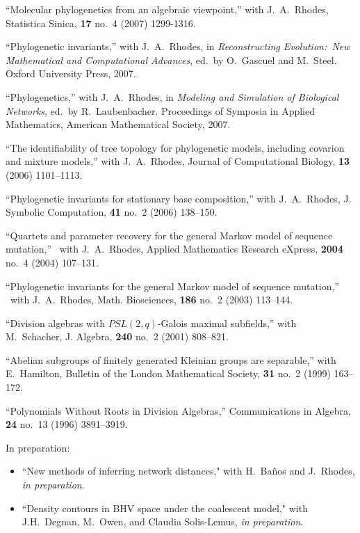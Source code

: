 \documentclass[10pt]{report}
\begin{document}
{{``Molecular phylogenetics from an algebraic viewpoint,'' with J.~A.~Rhodes,
Statistica Sinica, {\bf 17} no.~4 (2007) 1299-1316.

``Phylogenetic invariants,'' with J.~A.~Rhodes, in
\emph{Reconstructing Evolution:~New Mathematical and Computational Advances}, ed.~by O.~Gascuel and
M.~Steel. Oxford University Press, 2007.

``Phylogenetics,'' with J.~A.~Rhodes, in \emph{Modeling and Simulation of
Biological Networks}, ed.~by R.~Laubenbacher. Proceedings of
Symposia in Applied Mathematics, American Mathematical Society,
2007.

``The identifiability of tree topology for phylogenetic models,
including covarion and mixture models,'' with J.~A.~Rhodes, Journal
of Computational Biology, {\bf 13}  (2006) 1101--1113.

``Phylogenetic invariants for stationary base composition,''
with J.~A.~Rhodes, J. Symbolic Computation, {\bf 41} no.~2
(2006) 138--150.

``Quartets and parameter recovery for the general Markov model of
sequence mutation,'' \ with J.~A.~Rhodes, Applied Mathematics
Research eXpress, {\bf 2004} no.~4 (2004) 107--131.

``Phylogenetic invariants for the general Markov model of sequence
mutation,'' \ with J.~A.~Rhodes, Math. Biosciences, {\bf 186}
no.~2 (2003) 113--144.

``Division algebras with $PSL(2,q)$-Galois maximal subfields,'' with
M.~Schacher, J. Algebra, {\bf 240} no.~2 (2001) 808--821.

``Abelian subgroups of finitely generated Kleinian groups are
separable,'' with E.~Hamilton, Bulletin of the London
Mathematical Society, {\bf 31} no.~2 (1999) 163--172.

``Polynomials Without Roots in Division Algebras,''
Communications in Algebra, {\bf 24} no.~13 (1996) 3891--3919.
}


{\sc In preparation:}


\begin{itemize}

 \setlength{\itemsep}{2pt}
 \setlength{\parskip}{0pt}
 \setlength{\parsep}{0pt}

\item ``New methods of inferring network distances,"
 with H.~Ba\~nos and J.~Rhodes, 
 \emph{in preparation}.
 
 \item ``Density contours in BHV space under the coalescent model,"
 with J.H.~Degnan, M.~Owen, and Claudia Solis-Lemus, 
 \emph{in preparation}.
 

\end{itemize}}
\end{document}
